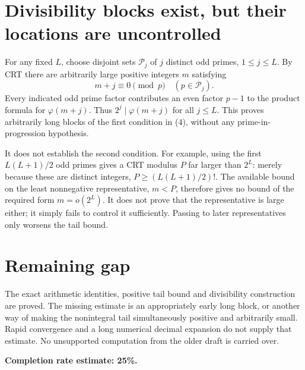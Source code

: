 \documentclass[11pt]{article}
\begin{document}
\section*{Divisibility blocks exist, but their locations are uncontrolled}
For any fixed $L$, choose disjoint sets $\mathcal P_j$ of $j$ distinct odd primes, $1\le j\le L$. By CRT there are arbitrarily large positive integers $m$ satisfying
\[
 m+j\equiv0\pmod p\quad(p\in\mathcal P_j).
\]
Every indicated odd prime factor contributes an even factor $p-1$ to the product formula for $\varphi(m+j)$. Thus $2^j\mid\varphi(m+j)$ for all $j\le L$. This proves arbitrarily long blocks of the first condition in (4), without any prime-in-progression hypothesis.

It does not establish the second condition. For example, using the first $L(L+1)/2$ odd primes gives a CRT modulus $P$ far larger than $2^L$: merely because these are distinct integers, $P\ge (L(L+1)/2)!$. The available bound on the least nonnegative representative, $m<P$, therefore gives no bound of the required form $m=o(2^L)$. It does not prove that the representative is large either; it simply fails to control it sufficiently. Passing to later representatives only worsens the tail bound.

\section*{Remaining gap}
The exact arithmetic identities, positive tail bound and divisibility construction are proved. The missing estimate is an appropriately early long block, or another way of making the nonintegral tail simultaneously positive and arbitrarily small. Rapid convergence and a long numerical decimal expansion do not supply that estimate. No unsupported computation from the older draft is carried over.

\textbf{Completion rate estimate: 25\%.}
\end{document}

